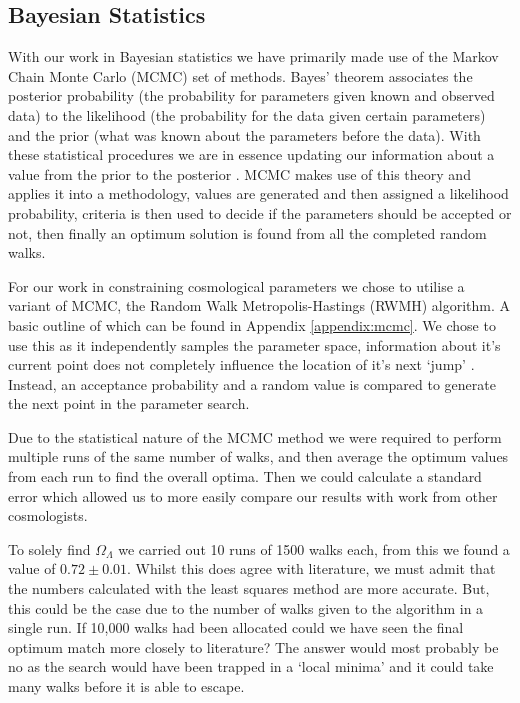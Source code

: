 \documentclass[twocolumn]{revtex4}
\begin{document}
{\vspace{-3ex}
\subsection{Bayesian Statistics} 
\vspace{-2ex}
With our work in Bayesian statistics we have primarily made use of the Markov Chain Monte Carlo (MCMC) set of methods. Bayes' theorem associates the posterior probability (the probability for parameters given known and observed data) to the likelihood (the probability for the data given certain parameters) and the prior (what was known about the parameters before the data). With these statistical procedures we are in essence updating our information about a value from the prior to the posterior \cite{mcmc_bs}. MCMC makes use of this theory and applies it into a methodology, values are generated and then assigned a likelihood probability, criteria is then used to decide if the parameters should be accepted or not, then finally an optimum solution is found from all the completed random walks.

For our work in constraining cosmological parameters we chose to utilise a variant of MCMC, the Random Walk Metropolis-Hastings (RWMH) algorithm. A basic outline of which can be found in Appendix \ref{appendix:mcmc}. We chose to use this as it independently samples the parameter space, information about it's current point does not completely influence the location of it's next `jump' \cite{mcmc_bs}. Instead, an acceptance probability and a random value is compared to generate the next point in the parameter search.

Due to the statistical nature of the MCMC method we were required to perform multiple runs of the same number of walks, and then average the optimum values from each run to find the overall optima. Then we could calculate a standard error which allowed us to more easily compare our results with work from other cosmologists. 

To solely find $\Omega_\Lambda$ we carried out 10 runs of 1500 walks each, from this we found a value of $0.72\pm0.01$. Whilst this does agree with literature, we must admit that the numbers calculated with the least squares method are more accurate. But, this could be the case due to the number of walks given to the algorithm in a single run. If 10,000 walks had been allocated could we have seen the final optimum match more closely to literature? The answer would most probably be no as the search would have been trapped in a `local minima' and it could take many walks before it is able to escape. 

}
\end{document}
